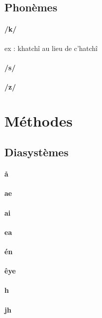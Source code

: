 \documentclass[french]{article}
\begin{document}
\subsection{Phonèmes}

\paragraph{/k/} ex : khatchî au lieu de c'hatchî
\paragraph{/s/}
\paragraph{/z/}

\section{Méthodes}

\subsection{Diasystèmes}

\paragraph{å}
\paragraph{ae}
\paragraph{ai}
\paragraph{ea}
\paragraph{én}
\paragraph{êye}
\paragraph{h}
\paragraph{jh}
\end{document}
